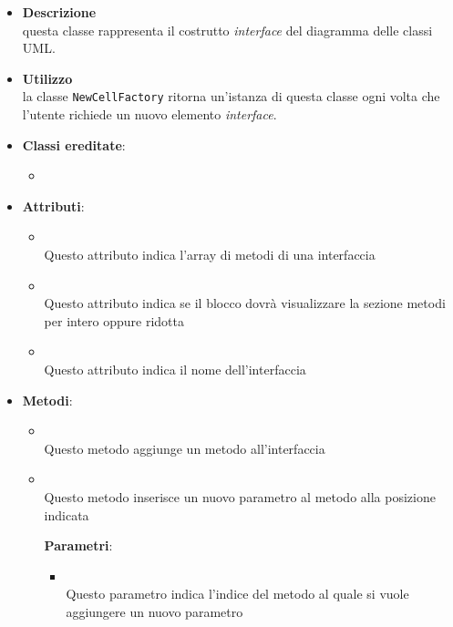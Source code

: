 \label{\nogloxy{swedesigner::client::model::celltypes::class::HxInterface}}
\begin{itemize}
\item \textbf{Descrizione}\\
questa classe rappresenta il costrutto \emph{interface} del diagramma delle classi UML.
\item \textbf{Utilizzo}\\
la classe \texttt{NewCellFactory} ritorna un'istanza di questa classe ogni volta che l'utente richiede un nuovo elemento \emph{interface}.
\item \textbf{Classi ereditate}:
\begin{itemize}
\item \hyperref[\nogloxy{swedesigner::client::model::celltypes::class::ClassDiagramElement}]{}
\end{itemize}
\item \textbf{Attributi}:
\begin{itemize}
\item {}
\\ Questo attributo indica l'array di metodi di una interfaccia
\item {}
\\ Questo attributo indica se il blocco dovrà visualizzare la sezione metodi per intero oppure ridotta

\item {}
\\ Questo attributo indica il nome dell'interfaccia

\end{itemize}
\item \textbf{Metodi}:
\begin{itemize}
\item {}
\\ Questo metodo aggiunge un metodo all'interfaccia
\item {}
\\ Questo metodo inserisce un nuovo parametro al metodo alla posizione indicata

\textbf{Parametri}:
\begin{itemize}
\item {}
\\ Questo parametro indica l'indice del metodo al quale si vuole aggiungere un nuovo parametro


\end{itemize}
\end{itemize}
\end{itemize}

